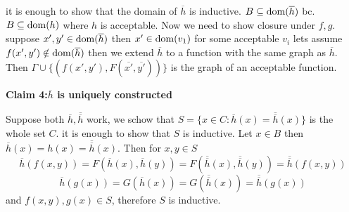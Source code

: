 \begin{claimproof}
    it is enough to show that the domain of $\overline{h}$ is inductive. 
    $B\subseteq\operatorname{dom} (\overline{h})$ bc. $B\subseteq\operatorname{dom} (h)$ where $h$ is acceptable.
    Now we need to show closure under $f,g$. suppose $x',y'\in\operatorname{dom} (\overline{h})$ then $x'\in\operatorname{dom} (v_1)$ 
    for some acceptable $v_i$ lets assume $f(x',y')\notin\operatorname{dom} (\overline{h})$
    then we extend $\overline{h}$ to a function with the same graph as $\overline{h}$.
    Then
    $\varGamma \cup \{(f(x',y'),F(\overline{x'},\overline{y'}))\}$ 
    is the graph of an acceptable function.
\end{claimproof}
\textbf{Claim 4:$\overline{h}$ is uniquely constructed}
\begin{claimproof}
    Suppose both $\overline{h},\overline{\overline{h}}$ work, we schow that $S=\{x\in C: \overline{h}(x)=\overline{\overline{h}}(x)\}$ is the whole set $C$.
    it is enough to show that $S$ is inductive.
    Let $x\in B$ then $\overline{h}(x) = h(x) = \overline{\overline{h}}(x)$.
Then for $x,y\in S$ 
\[\overline{h}(f(x,y)) = F(\overline{h}(x),\overline{h}(y))=  F(\overline{\overline{h}}(x),\overline{\overline{h}}(y))=\overline{\overline{h}}(f(x,y)) \]
\[\overline{h}(g(x)) = G(\overline{h}(x))=  G(\overline{\overline{h}}(x))=\overline{\overline{h}}(g(x)) \]
and $f(x,y),g(x)\in S$, therefore $S$ is inductive.
\end{claimproof}


